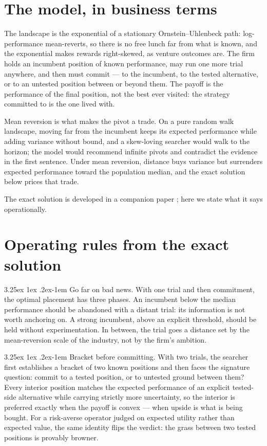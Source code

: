 \documentclass[11pt]{article}
\makeatletter
\theoremstyle{itheads}
\renewcommand\paragraph{\@startsection{paragraph}{4}{\z@}%
  {3.25ex \@plus1ex \@minus.2ex}{-1em}%
  {\normalfont\normalsize\itshape}}
\makeatother
\begin{document}
\section{The model, in business terms}

The landscape is the exponential of a stationary Ornstein--Uhlenbeck
path: log-performance mean-reverts, so there is no free lunch far from
what is known, and the exponential makes rewards right-skewed, as
venture outcomes are. The firm holds an incumbent position of known
performance, may run one more trial anywhere, and then must commit ---
to the incumbent, to the tested alternative, or to an untested position
between or beyond them. The payoff is the performance of the final
position, not the best ever visited: the strategy committed to is the
one lived with.

Mean reversion is what makes the pivot a trade. On a pure random walk
landscape, moving far from the incumbent keeps its expected performance
while adding variance without bound, and a skew-loving searcher would
walk to the horizon; the model would recommend infinite pivots and
contradict the evidence in the first sentence. Under mean reversion,
distance buys variance but surrenders expected performance toward the
population median, and the exact solution below prices that trade.

The exact solution is developed in a companion paper
\citep{cotton2026grass}; here we state what it says operationally.

\section{Operating rules from the exact solution}

\paragraph{Go far on bad news.} With one trial and then commitment, the
optimal placement has three phases. An incumbent below the median
performance should be abandoned with a distant trial: its information
is not worth anchoring on. A strong incumbent, above an explicit
threshold, should be held without experimentation. In between, the
trial goes a distance set by the mean-reversion scale of the industry,
not by the firm's ambition.

\paragraph{Bracket before committing.} With two trials, the searcher
first establishes a bracket of two known positions and then faces the
signature question: commit to a tested position, or to untested ground
between them? Every interior position matches the expected performance
of an explicit tested-side alternative while carrying strictly more
uncertainty, so the interior is preferred exactly when the payoff is
convex --- when upside is what is being bought. For a risk-averse
operator judged on expected utility rather than expected value, the
same identity flips the verdict: the grass between two tested positions
is provably browner.
\end{document}
